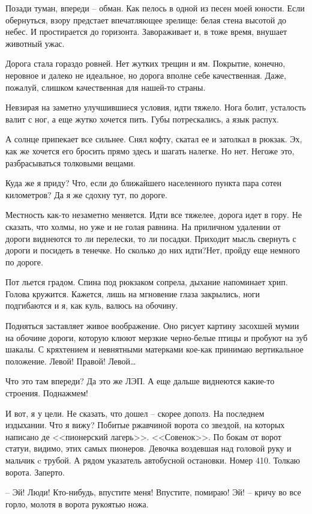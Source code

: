 \documentclass[a4paper]{book}
\begin{document}
Позади туман, впереди -- обман. Как пелось в одной из песен моей юности. Если обернуться, взору предстает впечатляющее зрелище: белая стена высотой до небес. И простирается до горизонта. Завораживает и, в тоже время, внушает животный ужас. 

Дорога стала гораздо ровней. Нет жутких трещин и ям. Покрытие, конечно, неровное и далеко не идеальное, но дорога вполне себе качественная. Даже, пожалуй, слишком качественная для нашей-то страны. 

Невзирая на заметно улучшившиеся условия, идти тяжело. Нога болит, усталость валит с ног, а еще жутко хочется пить. Губы потрескались, а язык распух. 

А солнце припекает все сильнее. Снял кофту, скатал ее и затолкал в рюкзак. Эх, как же хочется его бросить прямо здесь и шагать налегке. Но нет. Негоже это, разбрасываться толковыми вещами. 

Куда же я приду? Что, если до ближайшего населенного пункта пара сотен километров? Да я же сдохну тут, по дороге. 

Местность как-то незаметно меняется. Идти все тяжелее, дорога идет в гору. Не сказать, что холмы, но уже и не голая равнина. На приличном удалении от дороги виднеются то ли перелески, то ли посадки. Приходит мысль свернуть с дороги и посидеть в тенечке. Но сколько до них идти?Нет, пройду еще немного по дороге. 

Пот льется градом. Спина под рюкзаком сопрела, дыхание напоминает хрип. Голова кружится. Кажется, лишь на мгновение глаза закрылись, ноги подгибаются и я, как куль, валюсь на обочину. 

Подняться заставляет живое воображение. Оно рисует картину засохшей мумии на обочине дороги, которую клюют мерзкие черно-белые птицы и пробуют на зуб шакалы. С кряхтением и невнятными матерками кое-как принимаю вертикальное положение. Левой! Правой! Левой\ldots

Что это там впереди? Да это же ЛЭП. А еще дальше виднеются какие-то строения. Поднажмем!

И вот, я у цели. Не сказать, что дошел -- скорее дополз. На последнем издыхании. Что я вижу? Побитые ржавчиной ворота со звездой, на которых написано де <<пионерский лагерь>>. <<Совенок>>. По бокам от ворот статуи, видимо, этих самых пионеров. Девочка воздевшая над головой руку и мальчик c трубой. А рядом указатель автобусной остановки. Номер 410. Толкаю ворота. Заперто.

-- Эй! Люди! Кто-нибудь, впустите меня! Впустите, помираю! Эй! -- кричу во все горло, молотя в ворота рукоятью ножа. 
\end{document}
